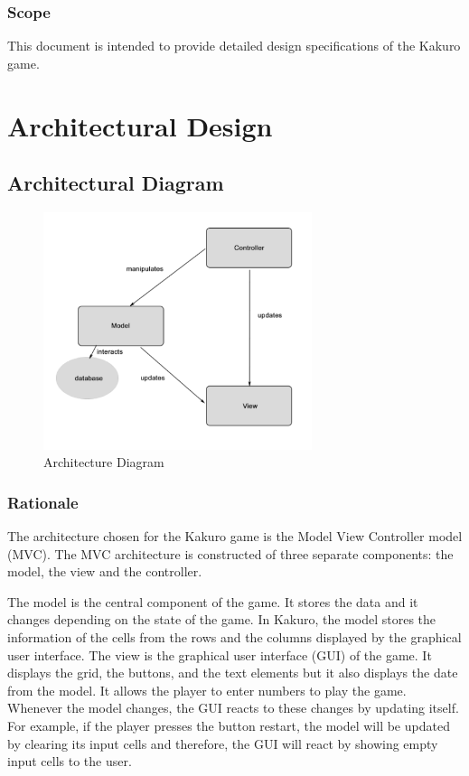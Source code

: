 \documentclass[12pt]{article}
\begin{document}
\subsubsection{Scope}
This document is intended to provide detailed design specifications of the Kakuro game.

\newpage

\section{Architectural Design} \label{sec:arch}



\subsection{Architectural Diagram}

\begin{figure}[htbp]
    \includegraphics[width=0.7\textwidth]{archi_diagram}
    \caption{Architecture Diagram}
    \label{fig:archi_diagram}
\end{figure}

\subsubsection{Rationale}

The architecture chosen for the Kakuro game is the Model View Controller model (MVC). The MVC architecture is constructed of three separate components: the model, the view and the controller.

The model is the central component of the game. It stores the data and it changes depending on the state of the game. In Kakuro, the model stores the information of the cells from the rows and the columns displayed by the graphical user interface. The view is the graphical user interface (GUI) of the game. It displays the grid, the buttons, and the text elements but it also displays the date from the model. It allows the player to enter numbers to play the game. Whenever the model changes, the GUI reacts to these changes by updating itself. For example, if the player presses the button restart, the model will be updated by clearing its input cells and therefore, the GUI will react by showing empty input cells to the user.
\end{document}
